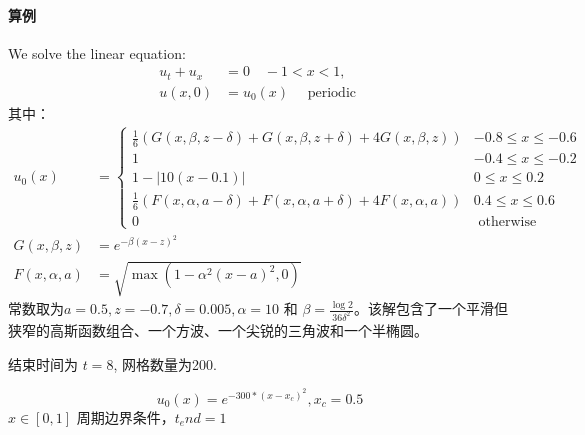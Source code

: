 \documentclass{book}
\begin{document}
\paragraph{算例}
\begin{example}
  We solve the linear equation\cite{RN56}:
  \begin{equation}
    \begin{aligned}
      u_{t}+u_{x} & =0 \quad-1<x<1,                    \\
      u(x, 0)     & =u_{0}(x) \quad \text { periodic }
    \end{aligned}
  \end{equation}
  其中：
  \begin{equation}
    \begin{aligned}
      u_{0}(x)        & =\begin{cases}
                           \frac{1}{6}(G(x, \beta, z-\delta)+G(x, \beta, z+\delta)+4 G(x, \beta, z))    & -0.8 \leq x \leq-0.6 \\
                           1                                                                            & -0.4 \leq x \leq-0.2 \\
                           1-|10(x-0.1)|                                                                & 0 \leq x \leq 0.2    \\
                           \frac{1}{6}(F(x, \alpha, a-\delta)+F(x, \alpha, a+\delta)+4 F(x, \alpha, a)) & 0.4 \leq x \leq 0.6  \\
                           0                                                                            & \text { otherwise }
                         \end{cases} \\
      G(x, \beta, z)  & =e^{-\beta(x-z)^{2}}                                                                                 \\
      F(x, \alpha, a) & =\sqrt{\max \left(1-\alpha^{2}(x-a)^{2}, 0\right)}
    \end{aligned}
  \end{equation}
  常数取为$a=0.5, z=-0.7, \delta=0.005, \alpha=10$ 和 $\beta=\frac{\log 2}{36 \delta^{2}}$。该解包含了一个平滑但狭窄的高斯函数组合、一个方波、一个尖锐的三角波和一个半椭圆。

  结束时间为 $t=8$, 网格数量为200.
\end{example}
\begin{example}
  \cite{RN204}
  \begin{equation}
    u_0(x) = e^{-300*(x-x_c)^2},x_c=0.5
  \end{equation}
  $x\in[0,1]$ 周期边界条件，$t_end=1$

\end{example}
\end{document}

